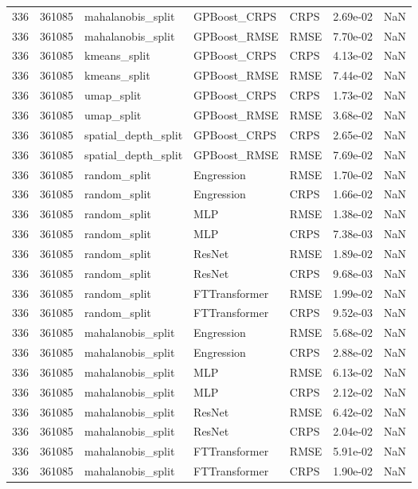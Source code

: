 \begin{tabular}{rrlllrr}
336 & 361085 & mahalanobis\_split & GPBoost\_CRPS & CRPS & 2.69e-02 & NaN \\
336 & 361085 & mahalanobis\_split & GPBoost\_RMSE & RMSE & 7.70e-02 & NaN \\
336 & 361085 & kmeans\_split & GPBoost\_CRPS & CRPS & 4.13e-02 & NaN \\
336 & 361085 & kmeans\_split & GPBoost\_RMSE & RMSE & 7.44e-02 & NaN \\
336 & 361085 & umap\_split & GPBoost\_CRPS & CRPS & 1.73e-02 & NaN \\
336 & 361085 & umap\_split & GPBoost\_RMSE & RMSE & 3.68e-02 & NaN \\
336 & 361085 & spatial\_depth\_split & GPBoost\_CRPS & CRPS & 2.65e-02 & NaN \\
336 & 361085 & spatial\_depth\_split & GPBoost\_RMSE & RMSE & 7.69e-02 & NaN \\
336 & 361085 & random\_split & Engression & RMSE & 1.70e-02 & NaN \\
336 & 361085 & random\_split & Engression & CRPS & 1.66e-02 & NaN \\
336 & 361085 & random\_split & MLP & RMSE & 1.38e-02 & NaN \\
336 & 361085 & random\_split & MLP & CRPS & 7.38e-03 & NaN \\
336 & 361085 & random\_split & ResNet & RMSE & 1.89e-02 & NaN \\
336 & 361085 & random\_split & ResNet & CRPS & 9.68e-03 & NaN \\
336 & 361085 & random\_split & FTTransformer & RMSE & 1.99e-02 & NaN \\
336 & 361085 & random\_split & FTTransformer & CRPS & 9.52e-03 & NaN \\
336 & 361085 & mahalanobis\_split & Engression & RMSE & 5.68e-02 & NaN \\
336 & 361085 & mahalanobis\_split & Engression & CRPS & 2.88e-02 & NaN \\
336 & 361085 & mahalanobis\_split & MLP & RMSE & 6.13e-02 & NaN \\
336 & 361085 & mahalanobis\_split & MLP & CRPS & 2.12e-02 & NaN \\
336 & 361085 & mahalanobis\_split & ResNet & RMSE & 6.42e-02 & NaN \\
336 & 361085 & mahalanobis\_split & ResNet & CRPS & 2.04e-02 & NaN \\
336 & 361085 & mahalanobis\_split & FTTransformer & RMSE & 5.91e-02 & NaN \\
336 & 361085 & mahalanobis\_split & FTTransformer & CRPS & 1.90e-02 & NaN \\

\end{tabular}
